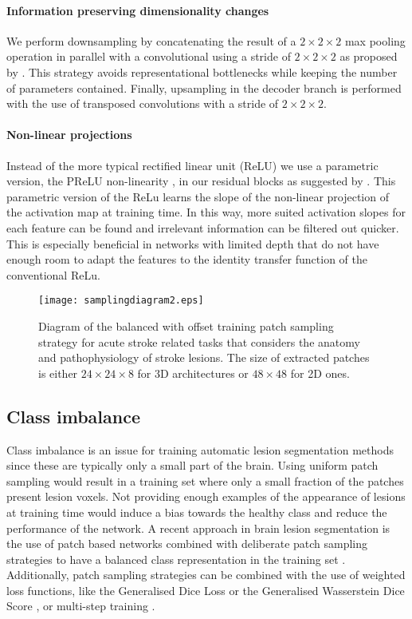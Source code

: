 \documentclass[letterpaper,final,authoryear,3p,times,twocolumn]{elsarticle}
\begin{document}
\paragraph{Information preserving dimensionality changes} We perform downsampling by concatenating the result of a $2\times2\times2$ max pooling operation in parallel with a convolutional using a stride of $2\times2\times2$ as proposed by \cite{Szegedy2015}. This strategy avoids representational bottlenecks while keeping the number of parameters contained. Finally, upsampling in the decoder branch is performed with the use of transposed convolutions with a stride of $2\times2\times2$.

\paragraph{Non-linear projections} Instead of the more typical rectified linear unit (ReLU) \citep{NairVinodandHinton2010} we use a parametric version, the PReLU non-linearity \citep{He2015}, in our residual blocks as suggested by \cite{Paszke2016}. This parametric version of the ReLu learns the slope of the non-linear projection of the activation map at training time. In this way, more suited activation slopes for each feature can be found and irrelevant information can be filtered out quicker. This is especially beneficial in networks with limited depth that do not have enough room to adapt the features to the identity transfer function of the conventional ReLu.

\begin{figure*}
	\centering
	\texttt{[image: samplingdiagram2.eps]}
	\caption[]{Diagram of the balanced with offset training patch sampling strategy for acute stroke related tasks that considers the anatomy and pathophysiology of stroke lesions. The size of extracted patches is either $24\times24\times8$ for 3D architectures or $48\times48$ for 2D ones.}
	\label{fig:samplingdiagram}
\end{figure*}

\subsection{Class imbalance} \label{subsec:imbalance}

Class imbalance is an issue for training automatic lesion segmentation methods since these are typically only a small part of the brain. Using uniform patch sampling would result in a training set where only a small fraction of the patches present lesion voxels. Not providing enough examples of the appearance of lesions at training time would induce a bias towards the healthy class and reduce the performance of the network. A recent approach in brain lesion segmentation is the use of patch based networks combined with deliberate patch sampling strategies to have a balanced class representation in the training set \citep{Wang2016, Havaei2017, Kamnitsas2017dm, Chen2017, Guerrero2018uresnet}. Additionally, patch sampling strategies can be combined with the use of weighted loss functions, like the Generalised Dice Loss \citep{Sudre} or the Generalised Wasserstein Dice Score \citep{Fidon2018}, or multi-step training \citep{Havaei2017}. 
\end{document}
